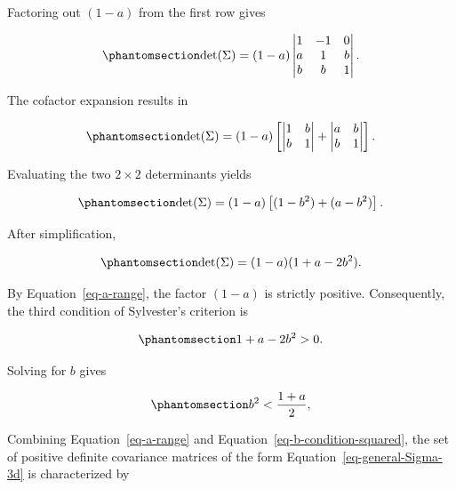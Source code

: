 \documentclass[
  12pt,
]{article}
\begin{document}
Factoring out \((1-a)\) from the first row gives

\begin{equation}\protect\phantomsection\label{eq-full-determinant-factorized}{
\det(\Sigma)
=
(1-a)
\begin{vmatrix}
1 & -1 & 0 \\
a & 1 & b \\
b & b & 1
\end{vmatrix}.
}\end{equation}

The cofactor expansion results in

\begin{equation}\protect\phantomsection\label{eq-full-determinant-expansion}{
\det(\Sigma)
=
(1-a)
\left[
\begin{vmatrix}
1 & b \\
b & 1
\end{vmatrix}
+
\begin{vmatrix}
a & b \\
b & 1
\end{vmatrix}
\right].
}\end{equation}

Evaluating the two \(2 \times 2\) determinants yields

\begin{equation}\protect\phantomsection\label{eq-full-determinant-evaluated}{
\det(\Sigma)
=
(1-a)
\left[
(1-b^2) + (a-b^2)
\right].
}\end{equation}

After simplification,

\begin{equation}\protect\phantomsection\label{eq-full-determinant}{
\det(\Sigma)
=
(1-a)(1+a-2b^2).
}\end{equation}

By Equation~\ref{eq-a-range}, the factor \((1-a)\) is strictly positive.
Consequently, the third condition of Sylvester's criterion is

\begin{equation}\protect\phantomsection\label{eq-third-principal-minor-condition}{
1+a-2b^2 > 0.
}\end{equation}

Solving for \(b\) gives

\begin{equation}\protect\phantomsection\label{eq-b-condition-squared}{
b^2 < \frac{1+a}{2},
}\end{equation}

Combining Equation~\ref{eq-a-range} and
Equation~\ref{eq-b-condition-squared}, the set of positive definite
covariance matrices of the form Equation~\ref{eq-general-Sigma-3d} is
characterized by
\end{document}
